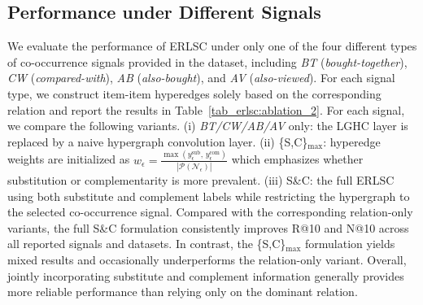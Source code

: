 \subsection{Performance under Different Signals}
We evaluate the performance of ERLSC under only one of the four different types of co-occurrence signals provided in the dataset, including \textit{BT} (\textit{bought-together}), \textit{CW} (\textit{compared-with}), \textit{AB} (\textit{also-bought}), and \textit{AV} (\textit{also-viewed}). For each signal type, we construct item-item hyperedges solely based on the corresponding relation and report the results in Table~\ref{tab_erlsc:ablation_2}.
For each signal, we compare the following variants. (i) \textit{BT/CW/AB/AV} only: the LGHC layer is replaced by a naive hypergraph convolution layer. (ii) \{S,C\}$_{\max}$: hyperedge weights are initialized as $w_\epsilon = \frac{\max\left(y^{\text{sub}}_\epsilon,\, y^{\text{com}}_\epsilon\right)}{|\mathcal{P}(\mathcal{N}_\epsilon)|}$ which emphasizes whether substitution or complementarity is more prevalent. (iii) S\&C: the full ERLSC using both substitute and complement labels while restricting the hypergraph to the selected co-occurrence signal. Compared with the corresponding relation-only variants, the full S\&C formulation consistently improves R@10 and N@10 across all reported signals and datasets. In contrast, the \{S,C\}$_{\max}$ formulation yields mixed results and occasionally underperforms the relation-only variant. Overall, jointly incorporating substitute and complement information generally provides more reliable performance than relying only on the dominant relation.




